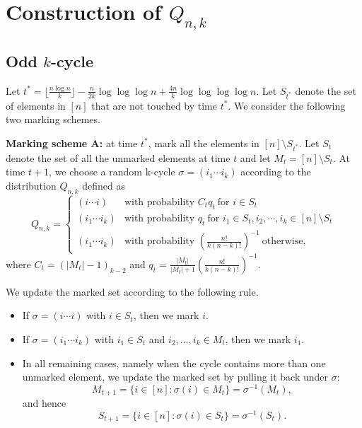 \section{Construction of $Q_{n,k}$}\label{section: coupling}

\subsection{Odd $k$-cycle}
Let $t^* = \lfloor  \frac{n\log n}{k}\rfloor - \frac{n}{2k}\log\log \log n+\frac{4n}{k}\log\log\log \log n$. Let $S_{t^*}$ denote the set of elements in $[n]$ that are not touched by time $t^*$. We consider the following two marking schemes. 

\noindent\textbf{Marking scheme A:} at time $t^*$, mark all the elements in $[n] \setminus S_{t^*}$. Let $S_t$ denote the set of all the unmarked elements at time $t$ and let $M_t = [n] \setminus S_t$. At time $t + 1$, we choose a random k-cycle $\sigma = (i_1 \cdots i_k)$ according to the distribution $Q_{n,k}$ defined as 
    \[
Q_{n,k}=\begin{cases}
(i\cdots i) & \text{with probability } C_tq_t \ \text{for } i\in S_{t}\\[6pt]
(i_1 \cdots i_k) & \text{with probability } q_t\ \text{for } i_1 \in S_{t}, i_2, \cdots, i_k \in [n] \setminus S_{t}\\[6pt]
(i_1 \cdots i_k) & \text{with probability } \left( \frac{n!}{k(n-k)!} \right)^{-1} \ \text{otherwise},
\end{cases}
\]
where $C_t = (|M_t|-1)_{k-2}$ and $q_t = \frac{|M_t|}{|M_t|+1}\left(\frac{n!}{k(n-k)!}\right)^{-1}$.

We update the marked set according to the following rule.
\begin{itemize}
    \item If $\sigma=(i\cdots i)$ with $i\in S_t$, then we mark $i$.
    \item If $\sigma=(i_1\cdots i_k)$ with $i_1\in S_t$ and
$i_2,\ldots,i_k\in M_t$, then we mark $i_1$.
\item In all remaining cases, namely when the cycle contains more than one unmarked element, we update the marked set by pulling it back under $\sigma$:
\[
    M_{t+1}
    =
    \{i\in[n]:\sigma(i)\in M_t\}
    =
    \sigma^{-1}(M_t),
\]
and hence
\[
    S_{t+1}
    =
    \{i\in[n]:\sigma(i)\in S_t\}
    =
    \sigma^{-1}(S_t).
\]
\end{itemize}




